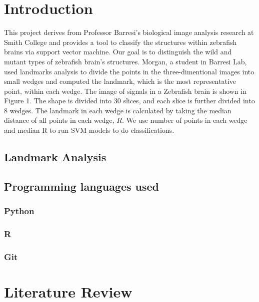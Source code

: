 \documentclass[10pt,letterpaper]{article}
\begin{document}
\section{Introduction}\label{introduction}

This project derives from Professor Barresi's biological image analysis
research at Smith College and provides a tool to classify the structures
within zebrafish brains via support vector machine. Our goal is to
distinguish the wild and mutant types of zebrafish brain's structures.
Morgan, a student in Barresi Lab, used landmarks analysis to divide the
points in the three-dimentional images into small wedges and computed
the landmark, which is the most representative point, within each wedge.
The image of signals in a Zebrafish brain is shown in Figure 1. The
shape is divided into 30 slices, and each slice is further divided into
8 wedges. The landmark in each wedge is calculated by taking the median
distance of all points in each wedge, \(R\). We use number of points in
each wedge and median R to run SVM models to do classifications.

\subsection{Landmark Analysis}\label{landmark-analysis}

\subsection{Programming languages
used}\label{programming-languages-used}

\subsubsection{Python}\label{python}

\subsubsection{R}\label{r}

\subsubsection{Git}\label{git}

\section{Literature Review}\label{literature-review}
\end{document}
